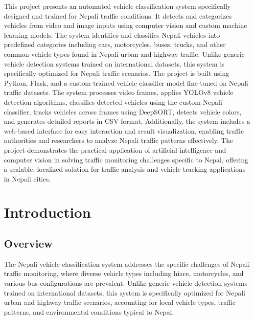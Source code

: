 \documentclass[12pt,a4paper]{report}
\begin{document}
This project presents an automated vehicle classification system specifically designed and trained for Nepali traffic conditions. It detects and categorizes vehicles from video and image inputs using computer vision and custom machine learning models. The system identifies and classifies Nepali vehicles into predefined categories including cars, motorcycles, buses, trucks, and other common vehicle types found in Nepali urban and highway traffic. Unlike generic vehicle detection systems trained on international datasets, this system is specifically optimized for Nepali traffic scenarios. The project is built using Python, Flask, and a custom-trained vehicle classifier model fine-tuned on Nepali traffic datasets. The system processes video frames, applies YOLOv8 vehicle detection algorithms, classifies detected vehicles using the custom Nepali classifier, tracks vehicles across frames using DeepSORT, detects vehicle colors, and generates detailed reports in CSV format. Additionally, the system includes a web-based interface for easy interaction and result visualization, enabling traffic authorities and researchers to analyze Nepali traffic patterns effectively. The project demonstrates the practical application of artificial intelligence and computer vision in solving traffic monitoring challenges specific to Nepal, offering a scalable, localized solution for traffic analysis and vehicle tracking applications in Nepali cities.

\newpage

\tableofcontents
\newpage

\listoffigures
\newpage

\listoftables
\newpage

\setcounter{page}{1}

\chapter{Introduction}

\section{Overview}
The Nepali vehicle classification system addresses the specific challenges of Nepali traffic monitoring, where diverse vehicle types including hiace, motorcycles, and various bus configurations are prevalent. Unlike generic vehicle detection systems trained on international datasets, this system is specifically optimized for Nepali urban and highway traffic scenarios, accounting for local vehicle types, traffic patterns, and environmental conditions typical to Nepal.
\end{document}
